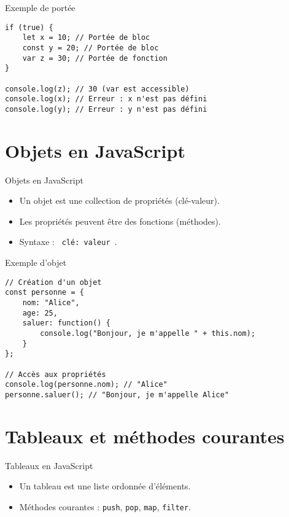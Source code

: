 \documentclass{beamer}
\begin{document}
\begin{frame}[fragile]{Exemple de portée}
\begin{verbatim}
if (true) {
    let x = 10; // Portée de bloc
    const y = 20; // Portée de bloc
    var z = 30; // Portée de fonction
}

console.log(z); // 30 (var est accessible)
console.log(x); // Erreur : x n'est pas défini
console.log(y); // Erreur : y n'est pas défini
\end{verbatim}
\end{frame}

\section{Objets en JavaScript}
\begin{frame}{Objets en JavaScript}
\begin{itemize}
    \item Un objet est une collection de propriétés (clé-valeur).
    \item Les propriétés peuvent être des fonctions (méthodes).
    \item Syntaxe : \texttt{{ clé: valeur }}.
\end{itemize}
\end{frame}

\begin{frame}[fragile]{Exemple d'objet}
\begin{verbatim}
// Création d'un objet
const personne = {
    nom: "Alice",
    age: 25,
    saluer: function() {
        console.log("Bonjour, je m'appelle " + this.nom);
    }
};

// Accès aux propriétés
console.log(personne.nom); // "Alice"
personne.saluer(); // "Bonjour, je m'appelle Alice"
\end{verbatim}
\end{frame}

\section{Tableaux et méthodes courantes}
\begin{frame}{Tableaux en JavaScript}
\begin{itemize}
    \item Un tableau est une liste ordonnée d'éléments.
    \item Méthodes courantes : \texttt{push}, \texttt{pop}, \texttt{map}, \texttt{filter}.
\end{itemize}
\end{frame}
\end{document}
